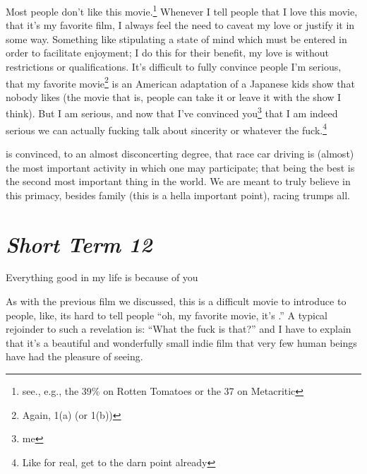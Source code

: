 \documentclass[../butidigress.tex]{subfiles}
\begin{document}
Most people don't like this movie.\footnote{see., e.g., the 39\% on Rotten Tomatoes or the 37 on Metacritic}
Whenever I tell people that I love this movie, that it's my favorite film, I always feel the need to caveat my love or justify it in some way.
Something like stipulating a state of mind which must be entered in order to facilitate enjoyment; I do this for their benefit, my love is without restrictions or qualifications.
It's difficult to fully convince people I'm serious, that my favorite movie\footnote{Again, 1(a) (or 1(b))} is an American adaptation of a Japanese kids show that nobody likes (the movie that is, people can take it or leave it with the show I think).
But I am serious, and now that I've convinced you\footnote{me} that I am indeed serious we can actually fucking talk about sincerity or whatever the fuck.\footnote{Like for real, get to the darn point already}

 is convinced, to an almost disconcerting degree, that race car driving is (almost) the most important activity in which one may participate; that being the best is the second most important thing in the world.
We are meant to truly believe in this primacy, besides family (this is a hella important point), racing trumps all.

\section{\textit{Short Term 12}}
\epigraph{Everything good in my life is because of you}{}

As with the previous film we discussed, this is a difficult movie to introduce to people, like, its hard to tell people ``oh, my favorite movie, it's .''
A typical rejoinder to such a revelation is: ``What the fuck is that?'' and I have to explain that it's a beautiful and wonderfully small indie film that very few human beings have had the pleasure of seeing.
\end{document}
